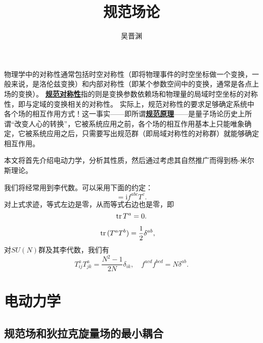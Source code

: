 \documentclass[hyperref, UTF8, a4paper]{ctexart}
\title{规范场论}
\author{吴晋渊}
\newcommand*{\ii}{\mathrm{i}}
\newcommand{\concept}[1]{\underline{\textbf{#1}}}
\begin{document}
\maketitle

物理学中的对称性通常包括时空对称性（即将物理事件的时空坐标做一个变换，一般来说，是洛伦兹变换）和内部对称性（即某个参数空间中的变换，通常是各点上场的变换）。
\concept{规范对称性}指的则是变换参数依赖场和物理量的局域时空坐标的对称性，即与定域的变换相关的对称性。
实际上，规范对称性的要求足够确定系统中各个场的相互作用方式！这一事实——即所谓\concept{规范原理}——是量子场论历史上所谓“改变人心的转换”，它被系统应用之前，各个场的相互作用基本上只能唯象确定，它被系统应用之后，只需要写出规范群（即局域对称性的对称群）就能够确定相互作用。

本文将首先介绍电动力学，分析其性质，然后通过考虑其自然推广而得到杨-米尔斯理论。

我们将经常用到李代数。可以采用下面的约定： %
\begin{equation}
    [T^a, T^b] = \ii f^{abc} T^c.
\end{equation}
对上式求迹，等式左边是零，从而等式右边也是零，即
\begin{equation}
    \trace{T^a} = 0.
\end{equation}

\begin{equation}
    \trace{(T^a T^b)} = \frac{1}{2} \delta^{ab}, \quad 
\end{equation}
对$SU(N)$群及其李代数，我们有
\begin{equation}
    T^a_{ij} T^a_{jk} = \frac{N^2 - 1}{2N} \delta_{ik},\quad f^{acd} f^{bcd} = N \delta^{ab}.
\end{equation}

\section{电动力学}

\subsection{规范场和狄拉克旋量场的最小耦合}
\end{document}
